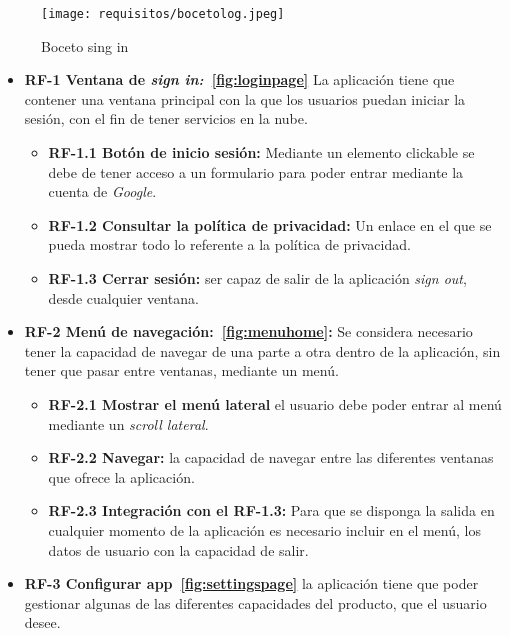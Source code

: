 \begin{figure}[H]
	\centering
	\texttt{[image: requisitos/bocetolog.jpeg]}
	\caption{Boceto sing in}\label{fig:bocetolog}
\end{figure}

\begin{itemize}
\tightlist
	\item \textbf{RF-1 Ventana de \emph{sign in:}~\ref{fig:loginpage}} La aplicación tiene que contener una ventana principal con la que los usuarios puedan iniciar la sesión, con el fin de tener servicios en la nube.
	
	\begin{itemize}
	\tightlist
	\item \textbf{RF-1.1 Botón de inicio sesión:} Mediante un elemento clickable se debe de tener acceso a un formulario para poder entrar mediante la cuenta de \emph{Google}.
	\item \textbf{RF-1.2 Consultar la política de privacidad:} Un enlace en el que se pueda mostrar todo lo referente a la política de privacidad.
	\item \textbf{RF-1.3 Cerrar sesión:} ser capaz de salir de la aplicación \emph{sign out}, desde cualquier ventana.
	\end{itemize}
	
	\item \textbf{RF-2 Menú de navegación:~\ref{fig:menuhome}:} Se considera necesario tener la capacidad de navegar de una parte a otra dentro de la aplicación, sin tener que pasar entre ventanas, mediante un menú. 
	
	\begin{itemize}
		\tightlist
		\item \textbf{RF-2.1 Mostrar el menú lateral} el usuario debe poder entrar al menú mediante un \emph{scroll lateral}.
		\item \textbf{RF-2.2 Navegar:} la capacidad de navegar entre las diferentes ventanas que ofrece la aplicación.
		\item \textbf{RF-2.3 Integración con el RF-1.3:} Para que se disponga la salida en cualquier momento de la aplicación es necesario incluir en el menú, los datos de usuario con la capacidad de salir.
	\end{itemize}

	\item \textbf{RF-3 Configurar app~\ref{fig:settingspage}} la aplicación tiene que poder gestionar algunas de las diferentes capacidades del producto, que el usuario desee.
	

\end{itemize}
